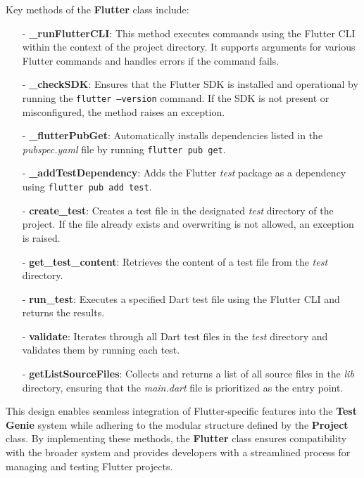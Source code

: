 Key methods of the \textbf{Flutter} class include:
\begin{itemize}
    \item[-] \textbf{\_runFlutterCLI}: This method executes commands using the Flutter CLI within the context of the project directory. It supports arguments for various Flutter commands and handles errors if the command fails.
    \item[-] \textbf{\_checkSDK}: Ensures that the Flutter SDK is installed and operational by running the \texttt{flutter --version} command. If the SDK is not present or misconfigured, the method raises an exception.
    \item[-] \textbf{\_flutterPubGet}: Automatically installs dependencies listed in the \textit{pubspec.yaml} file by running \texttt{flutter pub get}.
    \item[-] \textbf{\_addTestDependency}: Adds the Flutter \textit{test} package as a dependency using \texttt{flutter pub add test}.
    \item[-] \textbf{create\_test}: Creates a test file in the designated \textit{test} directory of the project. If the file already exists and overwriting is not allowed, an exception is raised.
    \item[-] \textbf{get\_test\_content}: Retrieves the content of a test file from the \textit{test} directory.
    \item[-] \textbf{run\_test}: Executes a specified Dart test file using the Flutter CLI and returns the results.
    \item[-] \textbf{validate}: Iterates through all Dart test files in the \textit{test} directory and validates them by running each test.
    \item[-] \textbf{getListSourceFiles}: Collects and returns a list of all source files in the \textit{lib} directory, ensuring that the \textit{main.dart} file is prioritized as the entry point.
\end{itemize}

This design enables seamless integration of Flutter-specific features into the \textbf{Test Genie} system while adhering to the modular structure defined by the \textbf{Project} class. By implementing these methods, the \textbf{Flutter} class ensures compatibility with the broader system and provides developers with a streamlined process for managing and testing Flutter projects.

